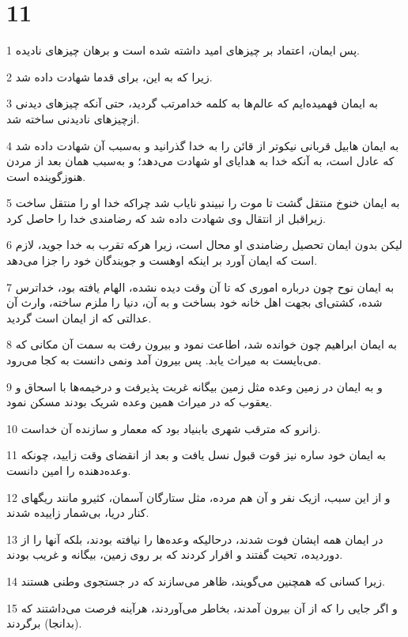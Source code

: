 \chapter{11}

\par 1 پس ایمان، اعتماد بر چیزهای امید داشته شده است و برهان چیزهای نادیده.
\par 2 زیرا که به این، برای قدما شهادت داده شد.
\par 3 به ایمان فهمیده‌ایم که عالم‌ها به کلمه خدامرتب گردید، حتی آنکه چیزهای دیدنی ازچیزهای نادیدنی ساخته شد.
\par 4 به ایمان هابیل قربانی نیکوتر از قائن را به خدا گذرانید و به‌سبب آن شهادت داده شد که عادل است، به آنکه خدا به هدایای او شهادت می‌دهد؛ و به‌سبب همان بعد از مردن هنوزگوینده است.
\par 5 به ایمان خنوخ منتقل گشت تا موت را نبیندو نایاب شد چرا‌که خدا او را منتقل ساخت زیراقبل از انتقال وی شهادت داده شد که رضامندی خدا را حاصل کرد.
\par 6 لیکن بدون ایمان تحصیل رضامندی او محال است، زیرا هر‌که تقرب به خدا جوید، لازم است که ایمان آورد بر اینکه اوهست و جویندگان خود را جزا می‌دهد.
\par 7 به ایمان نوح چون درباره اموری که تا آن وقت دیده نشده، الهام یافته بود، خداترس شده، کشتی‌ای بجهت اهل خانه خود بساخت و به آن، دنیا را ملزم ساخته، وارث آن عدالتی که از ایمان است گردید.
\par 8 به ایمان ابراهیم چون خوانده شد، اطاعت نمود و بیرون رفت به سمت آن مکانی که می‌بایست به میراث یابد. پس بیرون آمد ونمی دانست به کجا می‌رود.
\par 9 و به ایمان در زمین وعده مثل زمین بیگانه غربت پذیرفت و درخیمه‌ها با اسحاق و یعقوب که در میراث همین وعده شریک بودند مسکن نمود.
\par 10 زانرو که مترقب شهری بابنیاد بود که معمار و سازنده آن خداست.
\par 11 به ایمان خود ساره نیز قوت قبول نسل یافت و بعد از انقضای وقت زایید، چونکه وعده‌دهنده را امین دانست.
\par 12 و از این سبب، ازیک نفر و آن هم مرده، مثل ستارگان آسمان، کثیرو مانند ریگهای کنار دریا، بی‌شمار زاییده شدند.
\par 13 در ایمان همه ایشان فوت شدند، درحالیکه وعده‌ها را نیافته بودند، بلکه آنها را از دوردیده، تحیت گفتند و اقرار کردند که بر روی زمین، بیگانه و غریب بودند.
\par 14 زیرا کسانی که همچنین می‌گویند، ظاهر می‌سازند که در جستجوی وطنی هستند.
\par 15 و اگر جایی را که از آن بیرون آمدند، بخاطر می‌آوردند، هرآینه فرصت می‌داشتند که (بدانجا) برگردند.
